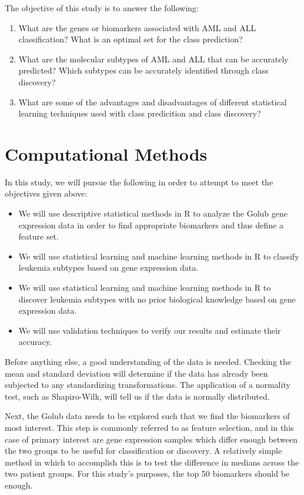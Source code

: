 \documentclass[]{article}
\begin{document}
The objective of this study is to answer the following:

\begin{enumerate}
\def\labelenumi{\arabic{enumi}.}
\item
  What are the genes or biomarkers associated with AML and ALL
  classification? What is an optimal set for the class prediction?
\item
  What are the molecular subtypes of AML and ALL that can be accurately
  predicted? Which subtypes can be accurately identified through class
  discovery?
\item
  What are some of the advantages and disadvantages of different
  statistical learning techniques used with class predicition and class
  discovery?
\end{enumerate}

\section{Computational Methods}\label{computational-methods}

In this study, we will pursue the following in order to attempt to meet
the objectives given above:

\begin{itemize}
\item
  We will use descriptive statistical methods in R to analyze the Golub
  gene expression data in order to find appropriate biomarkers and thus
  define a feature set.
\item
  We will use statistical learning and machine learning methods in R to
  classify leukemia subtypes based on gene expression data.
\item
  We will use statistical learning and machine learning methods in R to
  discover leukemia subtypes with no prior biological knowledge based on
  gene expression data.
\item
  We will use validation techniques to verify our results and estimate
  their accuracy.
\end{itemize}

Before anything else, a good understanding of the data is needed.
Checking the mean and standard deviation will determine if the data has
already been subjected to any standardizing transformations. The
application of a normality test, such as Shapiro-Wilk, will tell us if
the data is normally distributed.

Next, the Golub data needs to be explored such that we find the
biomarkers of most interest. This step is commonly referred to as
feature selection, and in this case of primary interest are gene
expression samples which differ enough between the two groups to be
useful for classification or discovery. A relatively simple method in
which to accomplish this is to test the difference in medians across the
two patient groups. For this study's purposes, the top 50 biomarkers
should be enough.
\end{document}
